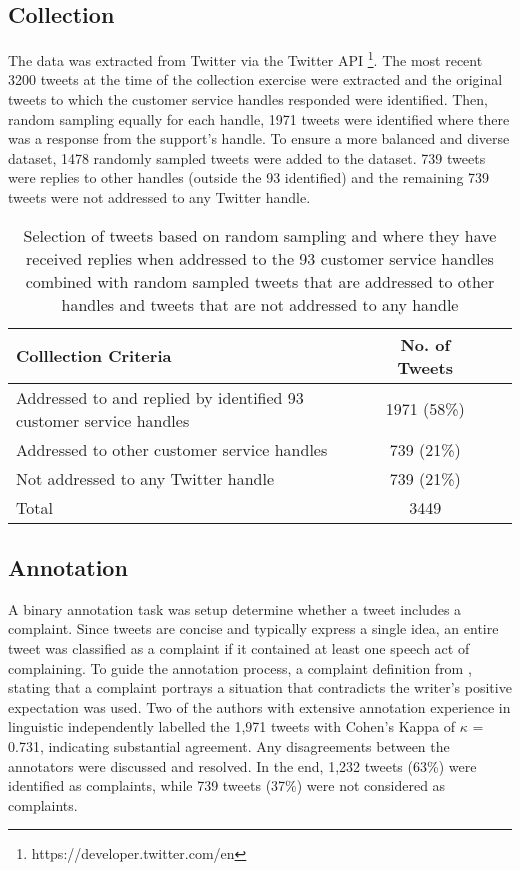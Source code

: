 \subsection{Collection}
The data was extracted from Twitter via the Twitter API \footnote{https://developer.twitter.com/en}. The most recent 3200 tweets at the time of the collection exercise were extracted and the original tweets to which the customer service handles responded were identified. Then, random sampling equally for each handle, 1971 tweets were identified where there was a response from the support's handle. To ensure a more balanced and diverse dataset, 1478 randomly sampled tweets were added to the dataset. 739 tweets were replies to other handles (outside the 93 identified) and the remaining 739 tweets were not addressed to any Twitter handle.
\begin{table}[ht]
    \centering
    \begin{tabular}{|l|c|c|c|}
    \hline
    \rowcolor[gray]{0.7}
    \textbf{Colllection Criteria} & \textbf{No. of Tweets} \\
    \hline
    Addressed to and replied by identified 93 customer service handles & 1971 (58\%) \\
    \hline
    Addressed to other customer service handles & 739 (21\%) \\
    \hline
    Not addressed to any Twitter handle & 739 (21\%) \\
    \hline    
    \rowcolor[gray]{0.9}
    Total & 3449 \\
    \hline
    \end{tabular}
    \caption{Selection of tweets based on random sampling and where they have received replies when addressed to the 93 customer service handles combined with random sampled tweets that are addressed to other handles and tweets that are not addressed to any handle}    
    \label{tab: tweet_counts}
\end{table}  

\subsection{Annotation}
A binary annotation task was setup determine whether a tweet includes a complaint. Since tweets are concise and typically express a single idea, an entire tweet was classified as a complaint if it contained at least one speech act of complaining. To guide the annotation process, a complaint definition from \cite{olshtain_speechact_1987}, stating that a complaint portrays a situation that contradicts the writer's positive expectation was used. Two of the authors with extensive annotation experience in linguistic independently labelled the 1,971 tweets with Cohen's Kappa of $\kappa$ = 0.731, indicating substantial agreement. Any disagreements between the annotators were discussed and resolved. In the end, 1,232 tweets (63\%) were identified as complaints, while 739 tweets (37\%) were not considered as complaints.




